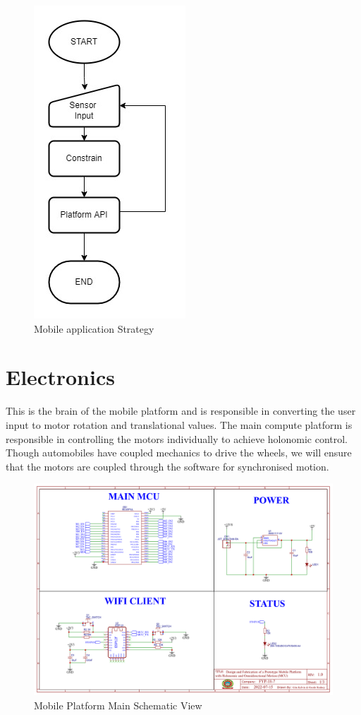 \begin{figure}[H]
    \centering
    \includegraphics[scale=0.5]{Figures/linefollowing-mobileapp.jpg}
    \caption{Mobile application Strategy}
    \label{fig:handmotionmobileapp}
\end{figure}

\section{Electronics}

This is the brain of the mobile platform and is responsible in converting the user input to motor rotation and translational values. The main compute platform is responsible in controlling the motors individually to achieve holonomic control. Though automobiles have coupled mechanics to drive the wheels, we will ensure that the motors are coupled through the software for synchronised motion.

\begin{figure}[H]
    \centering
    \includegraphics[scale=0.4]{Figures/MPmain.png}
    \caption{Mobile Platform Main Schematic View}
    \label{fig:mobileplatformmain}
\end{figure}


